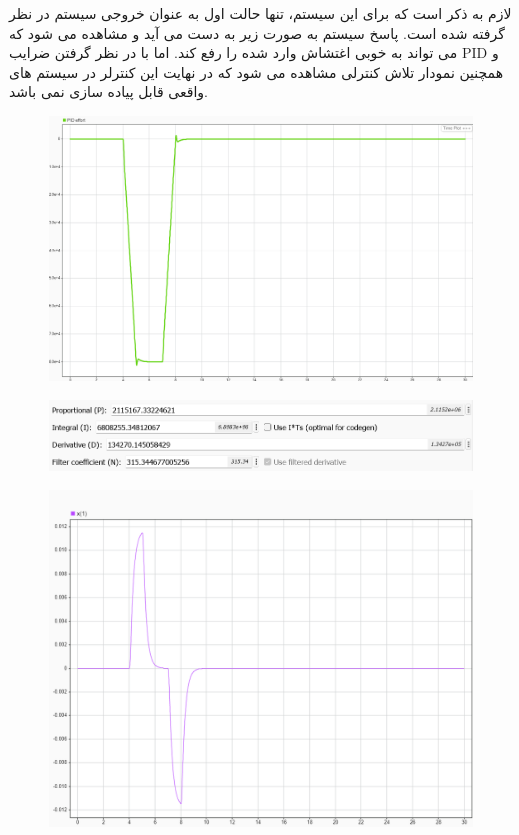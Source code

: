 لازم به ذکر است که برای این سیستم، تنها حالت اول به عنوان خروجی سیستم در نظر گرفته شده است. پاسخ سیستم به صورت زیر به دست می آید و مشاهده می شود که می تواند به خوبی اغتشاش وارد شده را رفع کند. اما با در نظر گرفتن ضرایب PID و همچنین نمودار تلاش کنترلی مشاهده می شود که در نهایت این کنترلر در سیستم های واقعی قابل پیاده سازی نمی باشد.

\begin{figure}[H]
	\centering
	\includegraphics[width=1\linewidth]{../img/9}
	\caption{}
	\label{fig:9}
\end{figure}

\begin{figure}[H]
	\centering
	\includegraphics[width=0.7\linewidth]{../img/10}
	\caption{}
	\label{fig:10}
\end{figure}

\begin{figure}[H]
	\centering
	\includegraphics[width=1\linewidth]{../img/11}
	\caption{}
	\label{fig:11}
\end{figure}

